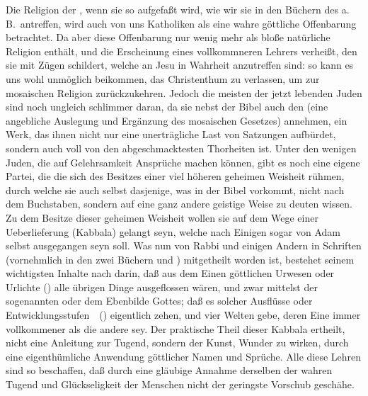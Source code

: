 \begin{aufza}
\item Die Religion der , wenn sie so aufgefaßt wird, wie wir sie in den Büchern des a.\,B.\ antreffen, wird auch von uns Katholiken als eine wahre göttliche Offenbarung betrachtet. Da aber diese Offenbarung nur wenig mehr als bloße natürliche Religion enthält, und die Erscheinung eines vollkommneren Lehrers verheißt, den sie mit Zügen schildert, welche an Jesu in Wahrheit anzutreffen sind: so kann es uns wohl unmöglich beikommen, das Christenthum zu verlassen, um zur mosaischen Religion zurückzukehren. Jedoch die meisten der jetzt lebenden Juden sind noch ungleich schlimmer daran, da sie nebst der Bibel auch den  (eine angebliche Auslegung und Ergänzung des mosaischen Gesetzes) annehmen, ein Werk, das ihnen nicht nur eine unerträgliche Last von Satzungen aufbürdet, sondern auch voll von den abgeschmacktesten Thorheiten ist. Unter den wenigen Juden, die auf Gelehrsamkeit Ansprüche machen können, gibt es noch eine eigene Partei, die  die sich des Besitzes einer viel höheren geheimen Weisheit rühmen, durch welche sie auch selbst dasjenige, was in der Bibel vorkommt, nicht nach dem Buchstaben, sondern auf eine ganz andere geistige Weise zu deuten wissen. Zu dem Besitze dieser geheimen Weisheit wollen sie auf dem Wege einer Ueberlieferung (Kabbala) gelangt seyn, welche nach Einigen sogar von Adam selbst ausgegangen seyn soll. Was nun von Rabbi  und einigen Andern in Schriften (vornehmlich in den zwei Büchern  und ) mitgetheilt worden ist, bestehet seinem wichtigsten Inhalte nach darin, daß aus dem Einen göttlichen Urwesen oder Urlichte () alle übrigen Dinge ausgeflossen wären, und zwar mittelst der sogenannten  oder dem Ebenbilde Gottes; daß es solcher Ausflüsse oder Entwicklungsstufen~\ () eigentlich zehen, und vier Welten gebe, deren Eine immer vollkommener als die andere sey. Der praktische Theil dieser Kabbala ertheilt, nicht eine Anleitung zur Tugend, sondern der Kunst, Wunder zu wirken, durch eine eigenthümliche Anwendung göttlicher Namen und Sprüche. Alle diese Lehren sind so beschaffen, daß durch eine gläubige Annahme derselben der wahren Tugend und Glückseligkeit der Menschen nicht der geringste Vorschub geschähe.

\end{aufza}
